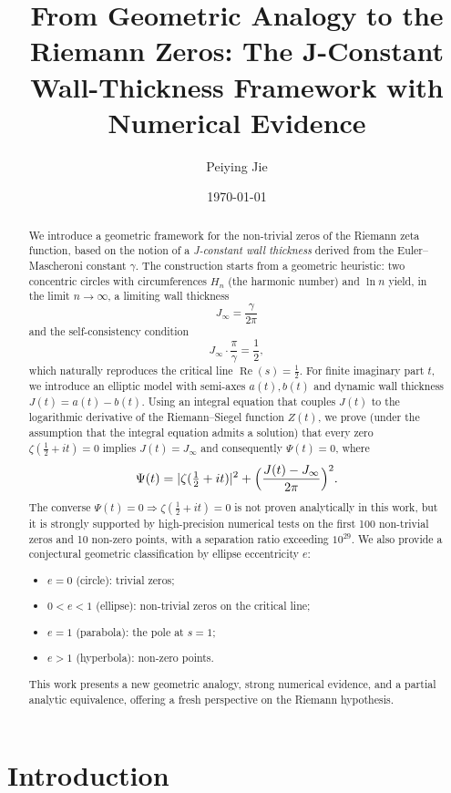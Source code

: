 \documentclass[12pt,a4paper]{article}
\title{From Geometric Analogy to the Riemann Zeros: The J-Constant Wall-Thickness Framework with Numerical Evidence}
\author{Peiying Jie}
\date{\today}
\begin{document}
\maketitle

\begin{abstract}
We introduce a geometric framework for the non-trivial zeros of the Riemann zeta function, based on the notion of a \emph{J-constant wall thickness} derived from the Euler--Mascheroni constant \(\gamma\). 
The construction starts from a geometric heuristic: two concentric circles with circumferences \(H_n\) (the harmonic number) and \(\ln n\) yield, in the limit \(n\to\infty\), a limiting wall thickness
\[
J_{\infty} = \frac{\gamma}{2\pi}
\]
and the self-consistency condition
\[
J_{\infty}\cdot\frac{\pi}{\gamma} = \frac12,
\]
which naturally reproduces the critical line \(\operatorname{Re}(s)=\frac12\).
For finite imaginary part \(t\), we introduce an elliptic model with semi-axes \(a(t), b(t)\) and dynamic wall thickness \(J(t)=a(t)-b(t)\). 
Using an integral equation that couples \(J(t)\) to the logarithmic derivative of the Riemann--Siegel function \(Z(t)\), we prove (under the assumption that the integral equation admits a solution) that every zero \(\zeta(\frac12+it)=0\) implies \(J(t)=J_{\infty}\) and consequently \(\Psi(t)=0\), where
\[
\Psi(t)=|\zeta(\tfrac12+it)|^2+\Bigl(\frac{J(t)-J_{\infty}}{2\pi}\Bigr)^2.
\]
The converse \(\Psi(t)=0\Rightarrow\zeta(\tfrac12+it)=0\) is not proven analytically in this work, but it is strongly supported by high-precision numerical tests on the first 100 non-trivial zeros and 10 non-zero points, with a separation ratio exceeding \(10^{29}\).
We also provide a conjectural geometric classification by ellipse eccentricity \(e\):
\begin{itemize}
\item \(e=0\) (circle): trivial zeros;
\item \(0<e<1\) (ellipse): non-trivial zeros on the critical line;
\item \(e=1\) (parabola): the pole at \(s=1\);
\item \(e>1\) (hyperbola): non-zero points.
\end{itemize}
This work presents a new geometric analogy, strong numerical evidence, and a partial analytic equivalence, offering a fresh perspective on the Riemann hypothesis.
\end{abstract}

\section{Introduction}
\end{document}
